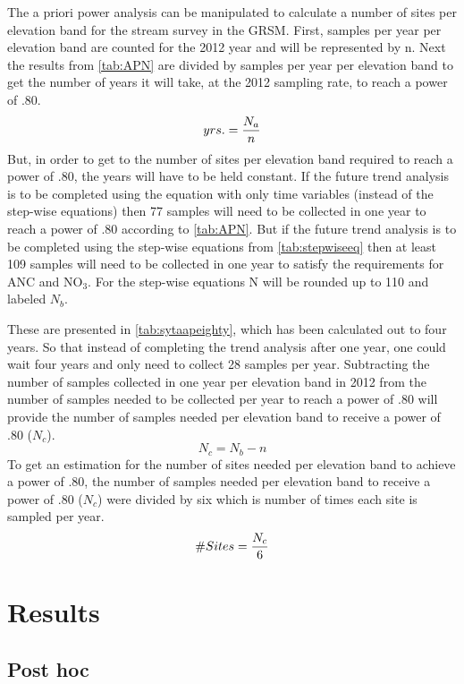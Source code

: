 The a priori power analysis can be manipulated to calculate a number of sites per elevation band for the stream survey in the GRSM.
First, samples per year per elevation band are counted for the 2012 year and will be represented by n.
Next the results from \autoref{tab:APN} are divided by samples per year per elevation band to get the number of years it will take, at the 2012 sampling rate, to reach a power of .80.
\begin{equation} \label{eq:yrs}
	yrs. = {N_a \over n}
\end{equation}
But, in order to get to the number of sites per elevation band required to reach a power of .80, the years will have to be held constant.
If the future trend analysis is to be completed using the equation with only time variables (instead of the step-wise equations) then 77 samples will need to be collected in one year to reach a power of .80 according to \autoref{tab:APN}.
But if the future trend analysis is to be completed using the step-wise equations from \autoref{tab:stepwiseeq} then at least 109 samples will need to be collected in one year to satisfy the requirements for ANC and NO$_3$.
For the step-wise equations N will be rounded up to 110 and labeled $N_b$.

These are presented in \autoref{tab:sytaapeighty}, which has been calculated out to four years.
So that instead of completing the trend analysis after one year, one could wait four years and only need to collect 28 samples per year.
Subtracting the number of samples collected in one year per elevation band in 2012 from the number of samples needed to be collected per year to reach a power of .80 will provide the number of samples needed per elevation band to receive a power of .80 ($N_c$).
\begin{equation} \label{eq:Nc}
	N_c={N_b - n}
\end{equation}
To get an estimation for the number of sites needed per elevation band to achieve a power of .80, the number of samples needed per elevation band to receive a power of .80 ($N_c$) were divided by six which is number of times each site is sampled per year.
\begin{equation}\label{eq:sites}
	\#Sites = {N_c \over 6}
\end{equation}

\section{Results}

\subsection{Post hoc}

